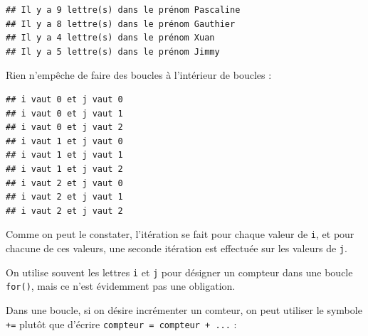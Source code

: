 \documentclass[12pt,]{book}
\newenvironment{Shaded}{\begin{snugshade}}{\end{snugshade}}
\newcommand{\KeywordTok}[1]{\textcolor[rgb]{0.13,0.29,0.53}{\textbf{#1}}}
\newcommand{\DecValTok}[1]{\textcolor[rgb]{0.00,0.00,0.81}{#1}}
\newcommand{\SpecialCharTok}[1]{\textcolor[rgb]{0.00,0.00,0.00}{#1}}
\newcommand{\StringTok}[1]{\textcolor[rgb]{0.31,0.60,0.02}{#1}}
\newcommand{\ControlFlowTok}[1]{\textcolor[rgb]{0.13,0.29,0.53}{\textbf{#1}}}
\newcommand{\OperatorTok}[1]{\textcolor[rgb]{0.81,0.36,0.00}{\textbf{#1}}}
\newcommand{\BuiltInTok}[1]{#1}
\newcommand{\NormalTok}[1]{#1}
\numberwithin{equation}{section}
\numberwithin{countremarque}{section}
\let\BeginKnitrBlock\begin \let\EndKnitrBlock\end
\begin{document}
\begin{lstlisting}
## Il y a 9 lettre(s) dans le prénom Pascaline
## Il y a 8 lettre(s) dans le prénom Gauthier
## Il y a 4 lettre(s) dans le prénom Xuan
## Il y a 5 lettre(s) dans le prénom Jimmy
\end{lstlisting}

Rien n'empêche de faire des boucles à l'intérieur de boucles :

\begin{Shaded}
\end{Shaded}

\begin{lstlisting}
## i vaut 0 et j vaut 0
## i vaut 0 et j vaut 1
## i vaut 0 et j vaut 2
## i vaut 1 et j vaut 0
## i vaut 1 et j vaut 1
## i vaut 1 et j vaut 2
## i vaut 2 et j vaut 0
## i vaut 2 et j vaut 1
## i vaut 2 et j vaut 2
\end{lstlisting}

Comme on peut le constater, l'itération se fait pour chaque valeur de
\texttt{i}, et pour chacune de ces valeurs, une seconde itération est
effectuée sur les valeurs de \texttt{j}.

\BeginKnitrBlock{remarque}
On utilise souvent les lettres \texttt{i} et \texttt{j} pour désigner un
compteur dans une boucle \texttt{for()}, mais ce n'est évidemment pas
une obligation.
\EndKnitrBlock{remarque}

Dans une boucle, si on désire incrémenter un comteur, on peut utiliser
le symbole \texttt{+=} plutôt que d'écrire
\texttt{compteur\ =\ compteur\ +\ ...} :

\begin{Shaded}
\end{Shaded}
\end{document}
